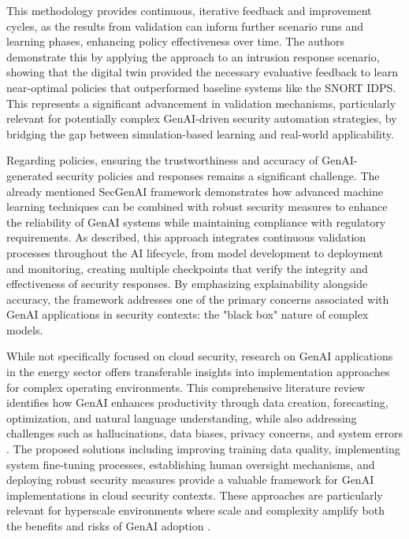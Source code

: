 This methodology provides continuous, iterative feedback and improvement cycles, as the results from validation can inform further scenario runs and learning phases, enhancing policy effectiveness over time\cite{hammar_digital_2023}. The authors demonstrate this by applying the approach to an intrusion response scenario, showing that the digital twin provided the necessary evaluative feedback to learn near-optimal policies that outperformed baseline systems like the SNORT IDPS\cite{zhou_study_2010}. This represents a significant advancement in validation mechanisms, particularly relevant for potentially complex GenAI-driven security automation strategies, by bridging the gap between simulation-based learning and real-world applicability\cite{hammar_digital_2023}.

Regarding policies, ensuring the trustworthiness and accuracy of GenAI-generated security policies and responses remains a significant challenge. The already mentioned SecGenAI framework demonstrates how advanced machine learning techniques can be combined with robust security measures to enhance the reliability of GenAI systems while maintaining compliance with regulatory requirements.\cite{haryanto_secgenai_2024}
As described, this approach integrates continuous validation processes throughout the AI lifecycle, from model development to deployment and monitoring, creating multiple checkpoints that verify the integrity and effectiveness of security responses. By emphasizing explainability alongside accuracy, the framework addresses one of the primary concerns associated with GenAI applications in security contexts: the "black box" nature of complex models.\cite{haryanto_secgenai_2024}

While not specifically focused on cloud security, research on GenAI applications in the energy sector offers transferable insights into implementation approaches for complex operating environments. This comprehensive literature review identifies how GenAI enhances productivity through data creation, forecasting, optimization, and natural language understanding, while also addressing challenges such as hallucinations, data biases, privacy concerns, and system errors \cite{surathunmanun_exploring_2024}.
The proposed solutions including improving training data quality, implementing system fine-tuning processes, establishing human oversight mechanisms, and deploying robust security measures provide a valuable framework for GenAI implementations in cloud security contexts. These approaches are particularly relevant for hyperscale environments where scale and complexity amplify both the benefits and risks of GenAI adoption \cite{surathunmanun_exploring_2024}.


